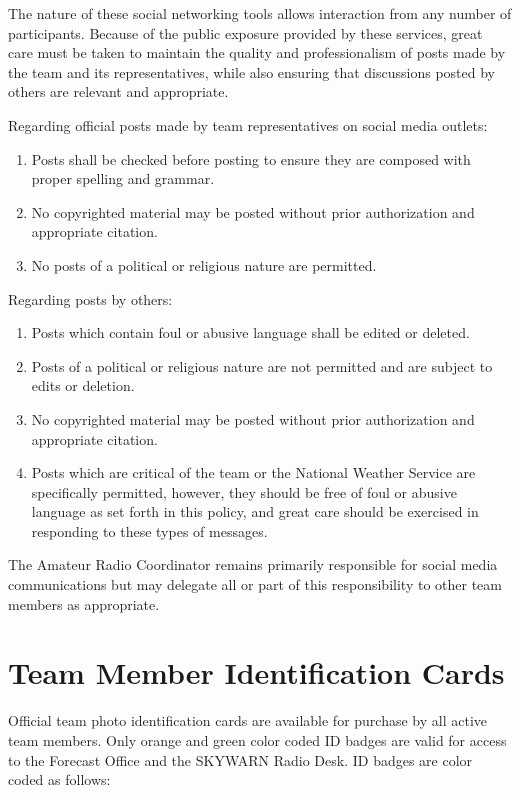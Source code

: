 \documentclass[pdflatex,letterpaper,twoside,12pt]{book}
\begin{document}
The nature of these social networking tools allows interaction from any number of participants.  Because of the public exposure provided by these services, great care must be taken to maintain the quality and professionalism of posts made by the team and its representatives, while also ensuring that discussions posted by others are relevant and appropriate.

Regarding official posts made by team representatives on social media outlets:

\begin{enumerate}
\item Posts shall be checked before posting to ensure they are composed with proper spelling and grammar.
\item No copyrighted material may be posted without prior authorization and appropriate citation.
\item No posts of a political or religious nature are permitted.
\end{enumerate}

Regarding posts by others:

\begin{enumerate}
\item Posts which contain foul or abusive language shall be edited or deleted.
\item Posts of a political or religious nature are not permitted and are subject to edits or deletion.
\item No copyrighted material may be posted without prior authorization and appropriate citation.
\item Posts which are critical of the team or the National Weather Service are specifically permitted, however, they should be free of foul or abusive language as set forth in this policy, and great care should be exercised in responding to these types of messages.
\end{enumerate}

The Amateur Radio Coordinator remains primarily responsible for social media communications but may delegate all or part of this responsibility to other team members as appropriate.


\section{Team Member Identification Cards}

Official team photo identification cards are available for purchase by all active team members.  Only orange and green color coded ID badges are valid for access to the Forecast Office and the SKYWARN Radio Desk.  ID badges are color coded as follows:
\end{document}

